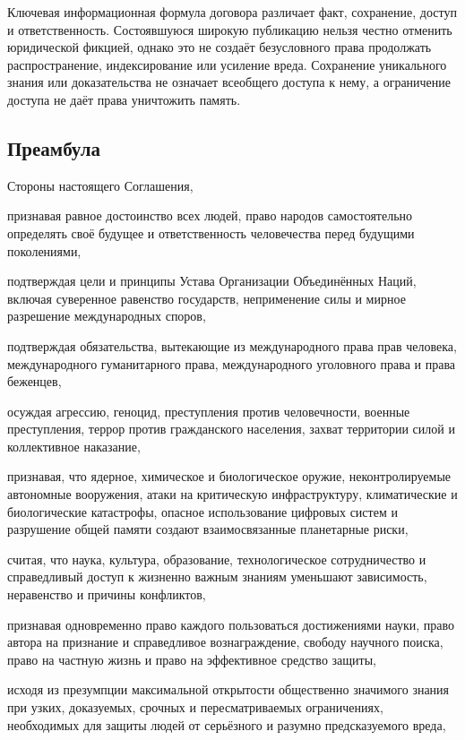 \documentclass[
  russian,
  11pt,
  a4paper,
]{article}
\begin{document}
Ключевая информационная формула договора различает факт, сохранение,
доступ и ответственность. Состоявшуюся широкую публикацию нельзя честно
отменить юридической фикцией, однако это не создаёт безусловного права
продолжать распространение, индексирование или усиление вреда.
Сохранение уникального знания или доказательства не означает всеобщего
доступа к нему, а ограничение доступа не даёт права уничтожить память.

\subsection{Преамбула}\label{ux43fux440ux435ux430ux43cux431ux443ux43bux430}

Стороны настоящего Соглашения,

признавая равное достоинство всех людей, право народов самостоятельно
определять своё будущее и ответственность человечества перед будущими
поколениями,

подтверждая цели и принципы Устава Организации Объединённых Наций,
включая суверенное равенство государств, неприменение силы и мирное
разрешение международных споров,

подтверждая обязательства, вытекающие из международного права прав
человека, международного гуманитарного права, международного уголовного
права и права беженцев,

осуждая агрессию, геноцид, преступления против человечности, военные
преступления, террор против гражданского населения, захват территории
силой и коллективное наказание,

признавая, что ядерное, химическое и биологическое оружие,
неконтролируемые автономные вооружения, атаки на критическую
инфраструктуру, климатические и биологические катастрофы, опасное
использование цифровых систем и разрушение общей памяти создают
взаимосвязанные планетарные риски,

считая, что наука, культура, образование, технологическое сотрудничество
и справедливый доступ к жизненно важным знаниям уменьшают зависимость,
неравенство и причины конфликтов,

признавая одновременно право каждого пользоваться достижениями науки,
право автора на признание и справедливое вознаграждение, свободу
научного поиска, право на частную жизнь и право на эффективное средство
защиты,

исходя из презумпции максимальной открытости общественно значимого
знания при узких, доказуемых, срочных и пересматриваемых ограничениях,
необходимых для защиты людей от серьёзного и разумно предсказуемого
вреда,
\end{document}
